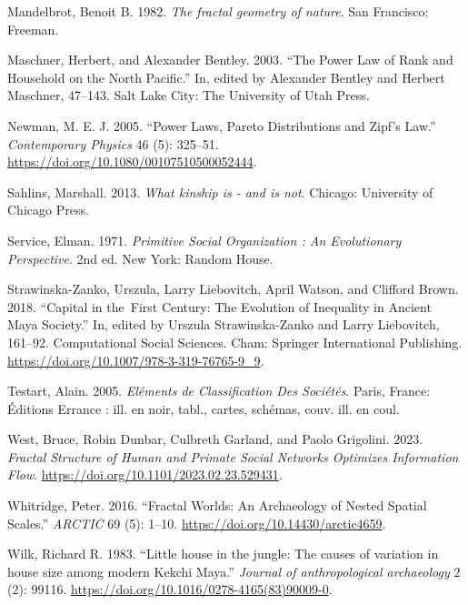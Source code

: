 \documentclass[
  12pt,
]{book}
\newlength{\cslhangindent}
\newlength{\cslentryspacingunit} %
\newenvironment{CSLReferences}[2] %
 {%
  \setlength{\parindent}{0pt}
  \ifodd #1
  \let\oldpar\par
  \def\par{\hangindent=\cslhangindent\oldpar}
  \fi
  \setlength{\parskip}{#2\cslentryspacingunit}
 }%
 {}
\begin{document}
\begin{CSLReferences}{1}{0}
\leavevmode{}%
Mandelbrot, Benoit B. 1982. \emph{The fractal geometry of nature}. San Francisco: Freeman.

\leavevmode{}%
Maschner, Herbert, and Alexander Bentley. 2003. {``The Power Law of Rank and Household on the North Pacific.''} In, edited by Alexander Bentley and Herbert Maschner, 47--143. Salt Lake City: The University of Utah Press.

\leavevmode{}%
Newman, M. E. J. 2005. {``Power Laws, Pareto Distributions and Zipf's Law.''} \emph{Contemporary Physics} 46 (5): 325--51. \url{https://doi.org/10.1080/00107510500052444}.

\leavevmode{}%
Sahlins, Marshall. 2013. \emph{What kinship is - and is not}. Chicago: University of Chicago Press.

\leavevmode{}%
Service, Elman. 1971. \emph{Primitive Social Organization : An Evolutionary Perspective}. 2nd ed. New York: Random House.

\leavevmode{}%
Strawinska-Zanko, Urszula, Larry Liebovitch, April Watson, and Clifford Brown. 2018. {``Capital in the~First Century: The Evolution of Inequality in Ancient Maya Society.''} In, edited by Urszula Strawinska-Zanko and Larry Liebovitch, 161--92. Computational Social Sciences. Cham: Springer International Publishing. \url{https://doi.org/10.1007/978-3-319-76765-9_9}.

\leavevmode{}%
Testart, Alain. 2005. \emph{Eléments de Classification Des Sociétés}. Paris, France: Éditions Errance : ill. en noir, tabl., cartes, schémas, couv. ill. en coul.

\leavevmode{}%
West, Bruce, Robin Dunbar, Culbreth Garland, and Paolo Grigolini. 2023. \emph{Fractal Structure of Human and Primate Social Networks Optimizes Information Flow}. \url{https://doi.org/10.1101/2023.02.23.529431}.

\leavevmode{}%
Whitridge, Peter. 2016. {``Fractal Worlds: An Archaeology of Nested Spatial Scales.''} \emph{ARCTIC} 69 (5): 1--10. \url{https://doi.org/10.14430/arctic4659}.

\leavevmode{}%
Wilk, Richard R. 1983. {``Little house in the jungle: The causes of variation in house size among modern Kekchi Maya.''} \emph{Journal of anthropological archaeology} 2 (2): 99116. \url{https://doi.org/10.1016/0278-4165(83)90009-0}.


\end{CSLReferences}
\end{document}
